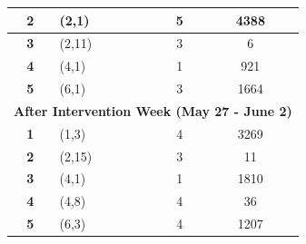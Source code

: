 \begin{table}[]
\begin{tabular}{clcc}
\textbf{2}             & (2,1)             & 5                                                                           & 4388                                                                                    \\ \hline
\textbf{3}             & (2,11)            & 3                                                               
& 6                                                                                       \\
\hline
\textbf{4}             & (4,1)             & 1                                                                           & 921                                                                                     \\
\hline
\textbf{5}             & (6,1)             & 3                                                                           & 1664                                                                                    \\ \hline
\multicolumn{4}{c}{\cellcolor[HTML]{ECF4FF}\textbf{After Intervention Week (May 27 - June 2)}}                                                                                                                     \\ \hline
\textbf{1}             & (1,3)             & 4                                                                           & 3269                                                                                    \\ \hline
\textbf{2}             & (2,15)            & 3                                                                           & 11                                                                                      \\ \hline
\textbf{3}             & (4,1)             & 1                                                                           & 1810                                                                                    \\ \hline
\textbf{4}             & (4,8)             & 4                                                                           & 36                                                                                      \\ \hline
\textbf{5}             & (6,3)             & 4                                                                           & 1207                                                                                    \\ \hline\midrule
\end{tabular}
\end{table}


